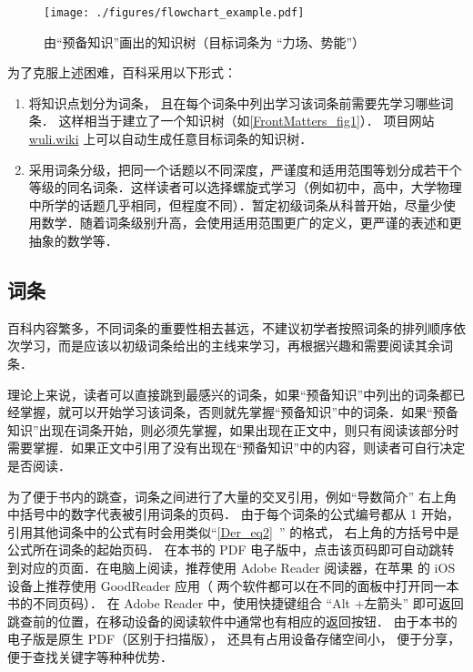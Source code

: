 \begin{figure}[ht]
\centering
\texttt{[image: ./figures/flowchart\_example.pdf]}
\caption{由“预备知识”画出的知识树（目标词条为 “力场、势能”）}\label{FrontMatters_fig1}
\end{figure}

为了克服上述困难，百科采用以下形式：
\begin{enumerate}
\item 将知识点划分为词条， 且在每个词条中列出学习该词条前需要先学习哪些词条． 这样相当于建立了一个知识树（如\autoref{FrontMatters_fig1}）． 项目网站 \href{https://wuli.wiki}{wuli.wiki} 上可以自动生成任意目标词条的知识树．
\item 采用词条分级，把同一个话题以不同深度，严谨度和适用范围等划分成若干个等级的同名词条．这样读者可以选择螺旋式学习（例如初中，高中，大学物理中所学的话题几乎相同，但程度不同）．暂定初级词条从科普开始，尽量少使用数学．随着词条级别升高，会使用适用范围更广的定义，更严谨的表述和更抽象的数学等．
\end{enumerate}

\subsection{词条}
百科内容繁多，不同词条的重要性相去甚远，不建议初学者按照词条的排列顺序依次学习，而是应该以初级词条给出的主线来学习，再根据兴趣和需要阅读其余词条．

理论上来说，读者可以直接跳到最感兴的词条，如果“预备知识”中列出的词条都已经掌握，就可以开始学习该词条，否则就先掌握“预备知识”中的词条．如果“预备知识”出现在词条开始，则必须先掌握，如果出现在正文中，则只有阅读该部分时需要掌握．如果正文中引用了没有出现在“预备知识”中的内容，则读者可自行决定是否阅读．

为了便于书内的跳查，词条之间进行了大量的交叉引用，例如“导数简介” 右上角中括号中的数字代表被引用词条的页码． 由于每个词条的公式编号都从 1 开始， 引用其他词条中的公式有时会用类似“\autoref{Der_eq2}~” 的格式， 右上角的方括号中是公式所在词条的起始页码． 在本书的 PDF 电子版中，点击该页码即可自动跳转到对应的页面．在电脑上阅读，推荐使用 Adobe Reader 阅读器，在苹果\textsuperscript{\textregistered} 的 iOS 设备上推荐使用 GoodReader 应用（ 两个软件都可以在不同的面板中打开同一本书的不同页码）． 在 Adobe Reader 中，使用快捷键组合 “Alt +左箭头” 即可返回跳查前的位置，在移动设备的阅读软件中通常也有相应的返回按钮． 由于本书的电子版是原生 PDF（区别于扫描版）， 还具有占用设备存储空间小， 便于分享， 便于查找关键字等种种优势．
